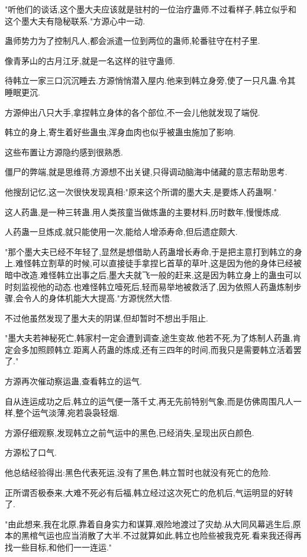 \begin{this_body}
"听他们的谈话,这个墨大夫应该就是驻村的一位治疗蛊师.不过看样子,韩立似乎和这个墨大夫有隐秘联系."方源心中一动.

蛊师势力为了控制凡人,都会派遣一位到两位的蛊师,轮番驻守在村子里.

像青茅山的古月江牙,就是一名这样的驻守蛊师.

待韩立一家三口沉沉睡去.方源悄悄潜入屋内.他来到韩立身旁,使了一只凡蛊.令其睡眠更沉.

方源伸出八只大手,拿捏韩立身体的各个部位,不一会儿他就发现了端倪.

韩立的身上,寄生着好些蛊虫,浑身血肉也似乎被蛊虫施加了影响.

这些布置让方源隐约感到很熟悉.

僵尸的弊端,就是思维蒋,方源想不出关键,只得调动脑海中储藏的意志帮助思考.

他搜刮记忆,这一次很快发现真相:"原来这个所谓的墨大夫,是要炼人药蛊啊."

这人药蛊,是一种三转蛊.用人类孩童当做炼蛊的主要材料,历时数年,慢慢炼成.

人药蛊一旦炼成,就只能使用一次,能给人增添寿命,但后遗症颇大.

"那个墨大夫已经不年轻了,显然是想借助人药蛊增长寿命,于是把主意打到韩立的身上.难怪韩立割草的时候,可以直接徒手拿捏匕首草的草叶,这是因为他的身体已经被暗中改造.难怪韩立出事之后,墨大夫就飞一般的赶来,这是因为韩立身上的蛊虫可以时刻监视他的动态.也难怪韩立噎死后,轻而易举地被救活了,因为依照人药蛊炼制步骤,会令人的身体机能大大提高."方源恍然大悟.

不过他虽然发现了墨大夫的阴谋,但却暂时不想出手阻止.

"墨大夫若神秘死亡,韩家村一定会遭到调查,途生变故.他若不死,为了炼制人药蛊,肯定会多加照顾韩立.距离人药蛊的炼成,还有三四年的时间,而我只是需要韩立活着罢了."

方源再次催动察运蛊,查看韩立的运气.

自从连运成功之后,韩立的运气便一落千丈,再无先前特别气象,而是仿佛周围凡人一样,整个运气淡薄,宛若袅袅轻烟.

方源仔细观察,发现韩立之前气运中的黑色,已经消失,呈现出灰白颜色.

方源松了口气.

他总结经验得出:黑色代表死运,没有了黑色,韩立暂时也就没有死亡的危险.

正所谓否极泰来,大难不死必有后福,韩立经过这次死亡的危机后,气运明显的好转了.

"由此想来,我在北原,靠着自身实力和谋算,艰险地渡过了灾劫.从大同风幕逃生后,原本的黑棺气运也应当消散了大半.不过就算如此,韩立也险些被我克死.看来我还得再找一些目标,和他们一一连运."


\end{this_body}
